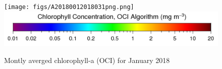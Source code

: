     \begin{figure}[H]
        \centering
        \texttt{[image: figs/A20180012018031png.png]}
        \includegraphics[scale=0.4]{figs/chl_colorbar.png}
        \caption{Montly averged chlorophyll-a (OCI) for January 2018}
    \end{figure}

